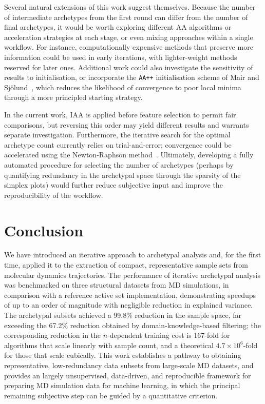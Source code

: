 \documentclass{WileyMSP-template}
\newcommand{\revision}[1]{{\color{red}#1}}
\begin{document}
Several natural extensions of this work suggest themselves. Because the number of intermediate archetypes from the first round can differ from the number of final archetypes, it would be worth exploring different AA algorithms or acceleration strategies at each stage, or even mixing approaches within a single workflow. For instance, computationally expensive methods that preserve more information could be used in early iterations, with lighter-weight methods reserved for later ones. Additional work could also investigate the sensitivity of results to initialisation, or incorporate the \texttt{AA++} initialisation scheme of Mair and Sj{\"o}lund~\cite{Mair2023AA++}, which reduces the likelihood of convergence to poor local minima through a more principled starting strategy.

In the current work, IAA is applied before feature selection to permit fair comparisons, but reversing this order may yield different results and warrants separate investigation. Furthermore, the iterative search for the optimal archetype count currently relies on trial-and-error; convergence could be accelerated using the Newton-Raphson method~\cite{Meza2011NewtonRaphson}. Ultimately, developing a fully automated procedure for selecting the number of archetypes (perhaps by quantifying redundancy in the archetypal space through the sparsity of the simplex plots) would further reduce subjective input and improve the reproducibility of the workflow.


\section{Conclusion}
\label{sec:conclusion}

We have introduced an iterative approach to archetypal analysis and, for the first time, applied it to the extraction of compact, representative sample sets from molecular dynamics trajectories. The performance of iterative archetypal analysis was benchmarked on three structural datasets from MD simulations, in comparison with a reference active set implementation, demonstrating speedups of up to an order of magnitude with negligible reduction in explained variance. The archetypal subsets achieved a 99.8\% reduction in the sample space, far exceeding the 67.2\% reduction obtained by domain-knowledge-based filtering; the \revision{corresponding reduction in the $n$-dependent training cost is 167-fold for algorithms that scale linearly with sample count, and a theoretical $4.7 \times 10^{6}$-fold for those that scale cubically}. This work establishes a pathway to obtaining representative, low-redundancy data subsets from large-scale MD datasets, and provides an \revision{largely} unsupervised, data-driven, and reproducible framework for preparing MD simulation data for machine learning\revision{, in which the principal remaining subjective step can be guided by a quantitative criterion}.\par
\end{document}
